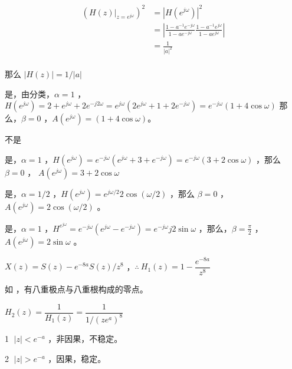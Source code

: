 \documentclass[lang=cn,11pt,a4paper,cite=authoryear,twocolumn]{elegantpaper}
\begin{document}

\[\begin{aligned}
    (\left.H(z)\right|_{z=e^{j\omega}})^2 &= |H(e^{j\omega})|^2 \\
    &= \left| \frac{1-a^{-1}e^{-j\omega}}{1-ae^{-j\omega}} \frac{1-a^{-1}e^{j\omega}}{1-ae^{j\omega}} \right| \\
    &= \frac{1}{|a|^2} \\
\end{aligned}\]

那么 \(|H(z)| = 1/|a|\)



是，由分类，\(\alpha = 1\) ，\(H(e^{j\omega}) = 2 + e^{j\omega} + 2 e^{-j2\omega} = e^{j\omega} (2e^{j\omega} + 1 + 2e^{-j\omega}) = e^{-j\omega} (1 + 4 \cos \omega )\) 那么，\(\beta = 0\) ，\(A(e^{j\omega}) =  (1 + 4 \cos \omega )\)。


不是


是，\(\alpha = 1\) ，\(H(e^{j\omega}) = e^{-j\omega}(e^{j\omega} + 3 + e^{-j\omega}) = e^{-j\omega} (3 + 2 \cos \omega)\) ，那么 \(\beta = 0\) ， \(A(e^{j\omega}) = 3 + 2 \cos \omega\) 


是，\(\alpha = 1/2\) ，\(H(e^{j\omega}) = e^{j\omega/2} 2 \cos (\omega/2)\) ，那么 \(\beta = 0\) ，\(A(e^{j\omega}) = 2 \cos (\omega/2)\) 。


是，\(\alpha = 1\) ，\(H^{e^{j\omega}} = e^{-j\omega} (e^{j\omega} - e^{-j\omega}) = e^{-j\omega} j 2 \sin \omega\) ，那么，\(\beta = \frac{\pi}{2}\) ，\(A({e^{j\omega}}) = 2 \sin \omega\) 。




\(X(z) = S(z) - e^{-8a} S(z) / z^8\) ，\(\therefore \: H_1(z) = 1 - \dfrac{e^{-8a}}{z^8}\)

如 ，有八重极点与八重根构成的零点。



\(H_2(z) = \dfrac{1}{H_1(z)} = \dfrac{1}{1/(ze^a)^8}\) 

\textcircled{1} \(|z| < e^{-a}\) ，非因果，不稳定。

\textcircled{2} \(|z| > e^{-a}\) ，因果，稳定。 
\end{document}
